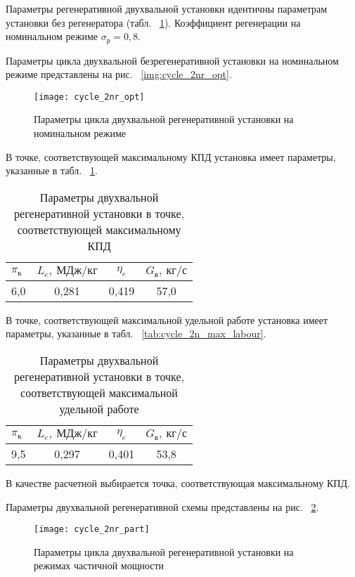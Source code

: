 Параметры регенеративной двухвальной установки идентичны параметрам установки без регенератора (табл. ~\ref{img:cycle_2n_opt}). Коэффициент регенерации на номинальном режиме $\sigma_р = 0,8$.

Параметры цикла двухвальной безрегенеративной установки на номинальном режиме представлены на рис. ~\ref{img:cycle_2nr_opt}.

\begin{figure}[H]
    \centering
    \texttt{[image: cycle\_2nr\_opt]}
    \caption{Параметры цикла двухвальной регенеративной установки на номинальном режиме}
    \label{img:cycle_2n_opt}
\end{figure}

В точке, соответствующей максимальному КПД установка имеет параметры, указанные в табл. ~\ref{tab:cycle_2nr_max_eta}.

\begin{longtable}{|p{7cm}|c|c|c|}
	\caption{Параметры двухвальной регенеративной установки в точке, соответствующей максимальному КПД} 
	\label{tab:cycle_2nr_max_eta}
	\hline
	\textbf{$\pi_к$} & \textbf{$L_e, \ МДж/кг$} & \textbf{$\eta_e$} & \textbf{$G_в, \ кг/с$} \\ \hline
	6,0 & 0,281 & 0,419 & 57,0 \\ \hline
\end{longtable}


В точке, соответствующей максимальной удельной работе установка имеет параметры, указанные в табл. ~\ref{tab:cycle_2n_max_labour}.
\begin{longtable}{|p{7cm}|c|c|c|}
	\caption{Параметры двухвальной регенеративной установки в точке, соответствующей максимальной удельной работе} 
	\label{tab:cycle_2nr_max_labour}
	\hline
	\textbf{$\pi_к$} & \textbf{$L_e, \ МДж/кг$} & \textbf{$\eta_e$} & \textbf{$G_в, \ кг/с$} \\ \hline
	9,5 & 0,297 & 0,401 & 53,8 \\ \hline
\end{longtable}

В качестве расчетной выбирается точка, соответствующая максимальному КПД.

Параметры двухвальной регенеративной схемы представлены на рис. ~\ref{img:cycle_2nr_part}.

\begin{figure}[H]
    \centering
    \texttt{[image: cycle\_2nr\_part]}
    \caption{Параметры цикла двухвальной регенеративной установки на режимах частичной мощности}
    \label{img:cycle_2nr_part}
\end{figure}

